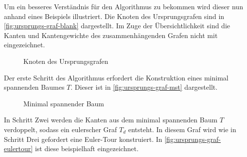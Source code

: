 \documentclass{article}
\begin{document}
Um ein besseres Verständnis für den Algorithmus zu bekommen wird dieser nun anhand eines Beispiels illustriert. Die Knoten des Ursprungsgrafen sind in \autoref{fig:ursprungs-graf-blank} dargestellt. Im Zuge der Übersichtlichkeit sind die Kanten und Kantengewichte des zusammenhängenden Grafen nicht mit eingezeichnet.

\begin{figure}[H]
\centering
{}
\caption{Knoten des Ursprungsgrafen}
\label{fig:ursprungs-graf-blank}
\end{figure}

Der erste Schritt des Algorithmus erfordert die Konstruktion eines minimal spannenden Baumes $T$. Dieser ist in \autoref{fig:ursprungs-graf-mst} dargestellt.

\begin{figure}[H]
\centering
{}
\caption{Minimal spannender Baum}
\label{fig:ursprungs-graf-mst}
\end{figure}

In Schritt Zwei werden die Kanten aus dem minimal spannenden Baum $T$ verdoppelt, sodass ein eulerscher Graf $T_d$ entsteht. In diesem Graf wird wie in Schritt Drei gefordert eine Euler-Tour konstruiert. In \autoref{fig:ursprungs-graf-eulertour} ist diese beispielhaft eingezeichnet.
\end{document}
